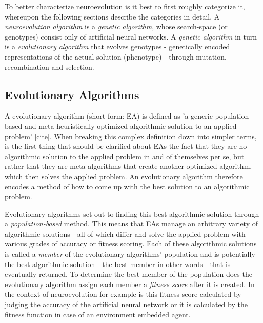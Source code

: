 \documentclass[journal, a4paper]{IEEEtran}
\begin{document}
To better characterize neuroevolution is it best to first roughly categorize it, whereupon the following sections describe the categories in detail. A \textit{neuroevolution algorithm} is a \textit{genetic algorithm}, whose search-space (or genotypes) consist only of artificial neural networks. A \textit{genetic algorithm} in turn is a \textit{evolutionary algorithm} that evolves genotypes - genetically encoded representations of the actual solution (phenotype) - through mutation, recombination and selection.



\subsection{Evolutionary Algorithms}

A evolutionary algorithm (short form: EA) is defined as 'a generic population-based and meta-heuristically optimized algorithmic solution to an applied problem' \href{https://en.wikipedia.org/wiki/Evolutionary_algorithm}{[cite]}. When breaking this complex definition down into simpler terms, is the first thing that should be clarified about EAs the fact that they are no algorithmic solution to the applied problem in and of themselves per se, but rather that they are meta-algorithms that create another optimized algorithm, which then solves the applied problem. An evolutionary algorithm therefore encodes a method of how to come up with the best solution to an algorithmic problem.

Evolutionary algorithms set out to finding this best algorithmic solution through a \textit{population-based} method. This means that EAs manage an arbitrary variety of algorithmic solutions - all of which differ and solve the applied problem with various grades of accuracy or fitness scoring. Each of these algorithmic solutions is called a \textit{member} of the evolutionary algorithms' population and is potentially the best algorithmic solution - the best member in other words - that is eventually returned. To determine the best member of the population does the evolutionary algorithm assign each member a \textit{fitness score} after it is created. In the context of neuroevolution for example is this fitness score calculated by judging the accuracy of the artificial neural network or it is calculated by the fitness function in case of an environment embedded agent.
\end{document}
